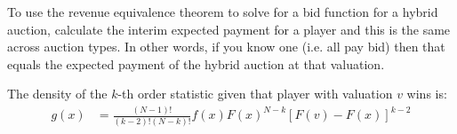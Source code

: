 \documentclass[11pt]{article} %
\begin{document}
To use the revenue equivalence theorem to solve for a bid function for a hybrid auction, calculate the interim expected payment for a player and this is the same across auction types. In other words, if you know one (i.e. all pay bid) then that equals the expected payment of the hybrid auction at that valuation.

The density of the $k$-th order statistic given that player with valuation $v$ wins is:
\begin{align*}
g(x) &= \frac{(N-1)!}{(k-2)!(N-k)!}f(x) F(x)^{N-k}[F(v) - F(x)]^{k-2}
\end{align*}
\end{document}
